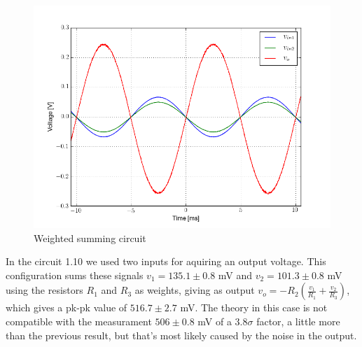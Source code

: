 \begin{figure}[H]
\centering
\includegraphics[width=.7\textwidth]{1/scope5.png}
\caption{Weighted summing circuit}
\end{figure}
In the circuit 1.10 we used two inputs for aquiring an output voltage. This configuration sums these signals $v_1 = 135.1\pm 0.8$ mV and $v_2 = 101.3\pm 0.8$ mV using the resistors $R_1$ and $R_3$ as weights, giving as output $v_o = - R_2 (\frac{v_1}{R_1} + \frac{v_2}{R_3})$, which gives a pk-pk value of $516.7\pm 2.7$ mV. The theory in this case is not compatible with the measurament $506\pm 0.8$ mV of a $3.8 \sigma$ factor, a little more than the previous result, but that's most likely caused by the noise in the output.
